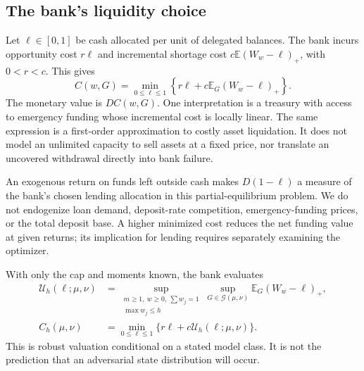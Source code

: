 \documentclass[11pt]{article}
\theoremstyle{definition}\newtheorem{definition}[theorem]{Definition}
\newcommand{\E}{\mathbb E}
\newcommand{\G}{\mathcal G}
\newcommand{\U}{\mathcal U}
\newcommand{\pos}[1]{\left(#1\right)_+}
\begin{document}
\subsection{The bank's liquidity choice}
Let \(\ell\in[0,1]\) be cash allocated per unit of delegated balances. The bank incurs opportunity cost \(r\ell\) and incremental shortage cost \(c\E\pos{W_w-\ell}\), with \(0<r<c\). This gives
\begin{equation}
 C(w,G)=\min_{0\leq\ell\leq1}
 \left\{r\ell+c\E_G\pos{W_w-\ell}\right\}.
 \label{eq:cost}
\end{equation}
The monetary value is \(DC(w,G)\). One interpretation is a treasury with access to emergency funding whose incremental cost is locally linear. The same expression is a first-order approximation to costly asset liquidation. It does not model an unlimited capacity to sell assets at a fixed price, nor translate an uncovered withdrawal directly into bank failure.

An exogenous return on funds left outside cash makes \(D(1-\ell)\) a measure of the bank's chosen lending allocation in this partial-equilibrium problem. We do not endogenize loan demand, deposit-rate competition, emergency-funding prices, or the total deposit base. A higher minimized cost reduces the net funding value at given returns; its implication for lending requires separately examining the optimizer.

With only the cap and moments known, the bank evaluates
\begin{align}
 \U_h(\ell;\mu,\nu)
 &=\sup_{\substack{m\geq1,\ w\geq0,\ \sum w_j=1\\ \max w_j\leq h}}
       \sup_{G\in\G(\mu,\nu)}\E_G\pos{W_w-\ell},\label{eq:U}\\
 C_h(\mu,\nu)&=\min_{0\leq\ell\leq1}
       \{r\ell+c\U_h(\ell;\mu,\nu)\}.\label{eq:robustcost}
\end{align}
This is robust valuation conditional on a stated model class. It is not the prediction that an adversarial state distribution will occur.
\end{document}
